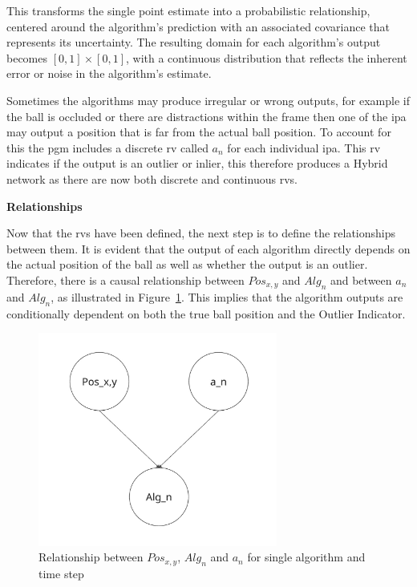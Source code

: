 \documentclass[12pt,a4paper]{article}
\begin{document}
This transforms the single point estimate into a probabilistic relationship, centered around the algorithm's prediction with an associated covariance that represents its uncertainty. The resulting domain for each algorithm’s output becomes $[0,1]\times[0,1]$, with a continuous distribution that reflects the inherent error or noise in the algorithm's estimate.

Sometimes the algorithms may produce irregular or wrong outputs, for example if the ball is occluded or there are distractions within the frame then one of the \acs{ipa} may output a position that is far from the actual ball position. To account for this the \acs{pgm} includes a discrete \acs{rv} called $a_n$ for each individual \acs{ipa}. This \acs{rv} indicates if the output is an outlier or inlier, this therefore produces a Hybrid network as there are now both discrete and continuous \acs{rv}s.

\textbf{Relationships}

Now that the \acs{rv}s have been defined, the next step is to define the relationships between them. It is evident that the output of each algorithm directly depends on the actual position of the ball as well as whether the output is an outlier. Therefore, there is a causal relationship between $Pos_{x,y}$ and $Alg_n$ and between $a_n$ and $Alg_n$, as illustrated in Figure~\ref{fig:smallBN}. This implies that the algorithm outputs are conditionally dependent on both the true ball position and the Outlier Indicator.

\begin{figure}[H]
	\centering
	\includegraphics[width=0.7\textwidth]{smallBN.jpg}
	\caption{Relationship between $Pos_{x,y}$, $Alg_n$ and $a_n$ for single algorithm and time step}
	\label{fig:smallBN}
\end{figure}
\end{document}
